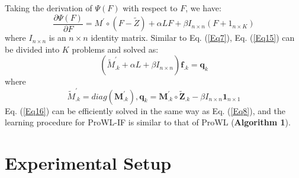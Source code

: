 \documentclass{llncs} %
\begin{document}
Taking the derivation of $\Psi(F)$ with respect to $F$, we have:
\begin{equation}
\frac{\partial \Psi(F)}{\partial F}=M^{'} \circ (F-\tilde{Z})+ \alpha LF+ \beta I_{n \times n}(F+1_{n \times K})
\label{Eq15}
\end{equation}
where $I_{n\times n}$ is an $n\times n$ identity matrix. Similar to Eq. (\ref{Eq7}), Eq. (\ref{Eq15}) can be divided into $K$ problems and solved as:
\begin{equation}
(\tilde{M}^{'}_{.k}+\alpha L +\beta I_{n\times n}) \mathbf{f}_{.k} = \mathbf{q}_k
\label{Eq16}
\end{equation}
where
\begin{equation}
\tilde{M}^{'}_{.k}=diag(\mathbf{M}^{'}_{.k}), \mathbf{q}_k=\mathbf{M}^{'}_{.k} \circ \tilde{\mathbf{Z}}_{.k}- \beta I_{n\times n} \mathbf{1}_{n\times 1}
 \label{Eq17}
\end{equation}
Eq. (\ref{Eq16}) can be efficiently solved in the same way as Eq. (\ref{Eq8}), and the learning procedure for ProWL-IF is similar to that of ProWL ({\bf Algorithm 1}).
\label{sec:t2:describe}
\section{Experimental Setup}
\label{expsetup}
\end{document}
